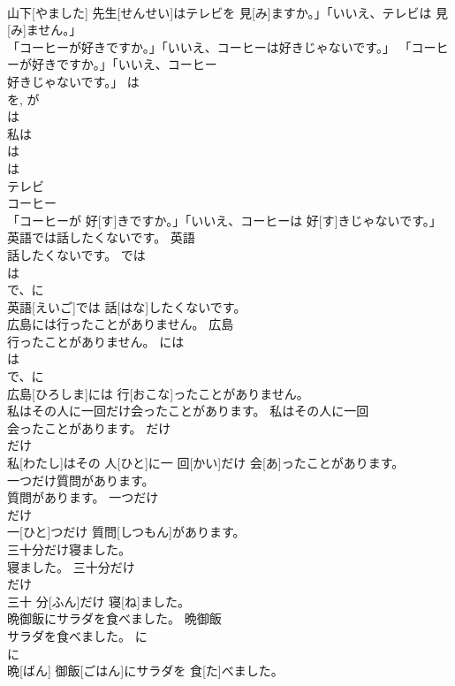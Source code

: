 \documentclass[8pt]{extreport}
\begin{document}
\begin{CJK}{UTF8}{min}
\\	山下[やました] 先生[せんせい]はテレビを 見[み]ますか。」「いいえ、テレビは 見[み]ません。」	
\\	「コーヒーが好きですか。」「いいえ、コーヒーは好きじゃないです。」	「コーヒーが好きですか。」「いいえ、コーヒー
\\	好きじゃないです。」	は	
\\	を, が 
\\	は 
\\	私は 
\\	は 
\\	は 
\\	テレビ 
\\	コーヒー 
\\	「コーヒーが 好[す]きですか。」「いいえ、コーヒーは 好[す]きじゃないです。」	
\\	英語では話したくないです。	英語
\\	話したくないです。	では	
\\	は 
\\	で、に 
\\	英語[えいご]では 話[はな]したくないです。	
\\	広島には行ったことがありません。	広島
\\	行ったことがありません。	には	
\\	は 
\\	で、に 
\\	広島[ひろしま]には 行[おこな]ったことがありません。	
\\	私はその人に一回だけ会ったことがあります。	私はその人に一回
\\	会ったことがあります。	だけ	
\\	だけ 
\\	私[わたし]はその 人[ひと]に一 回[かい]だけ 会[あ]ったことがあります。	
\\	一つだけ質問があります。	
\\	質問があります。	一つだけ	
\\	だけ 
\\	一[ひと]つだけ 質問[しつもん]があります。	
\\	三十分だけ寝ました。	
\\	寝ました。	三十分だけ	
\\	だけ 
\\	三十 分[ふん]だけ 寝[ね]ました。	
\\	晩御飯にサラダを食べました。	晩御飯
\\	サラダを食べました。	に	
\\	に 
\\	晩[ばん] 御飯[ごはん]にサラダを 食[た]べました。	

\end{CJK}
\end{document}
